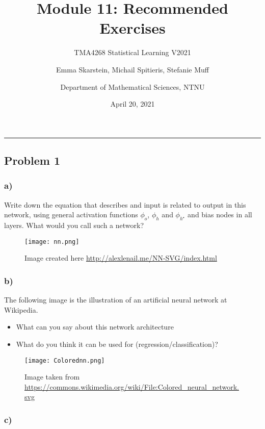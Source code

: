 \documentclass[]{article}
\title{Module 11: Recommended Exercises}
\subtitle{TMA4268 Statistical Learning V2021}
\author{Emma Skarstein, Michail Spitieris, Stefanie Muff \and Department of Mathematical Sciences, NTNU}
\date{April 20, 2021}
\providecommand{\tightlist}{%
  \setlength{\itemsep}{0pt}\setlength{\parskip}{0pt}}
\begin{document}
\maketitle

\begin{center}\rule{0.5\linewidth}{0.5pt}\end{center}

\hypertarget{problem-1}{%
\subsection{Problem 1}\label{problem-1}}

\hypertarget{a}{%
\subsubsection{a)}\label{a}}

Write down the equation that describes and input is related to output in
this network, using general activation functions \(\phi_o\), \(\phi_h\)
and \(\phi_{h^\star}\) and bias nodes in all layers. What would you call
such a network?

\begin{figure}
\centering
\texttt{[image: nn.png]}
\caption{Image created here
\url{http://alexlenail.me/NN-SVG/index.html}}
\end{figure}

\hypertarget{b}{%
\subsubsection{b)}\label{b}}

The following image is the illustration of an artificial neural network
at Wikipedia.

\begin{itemize}
\tightlist
\item
  What can you say about this network architecture
\item
  What do you think it can be used for (regression/classification)?
\end{itemize}

\begin{figure}
\centering
\texttt{[image: Colorednn.png]}
\caption{Image taken from
\url{https://commons.wikimedia.org/wiki/File:Colored_neural_network.svg}}
\end{figure}

\hypertarget{c}{%
\subsubsection{c)}\label{c}}
\end{document}
